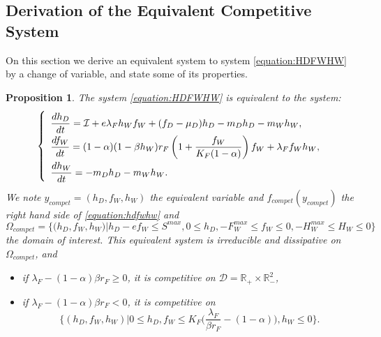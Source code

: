 \documentclass{article}
\newcommand{\lfw}{\lambda_{F}}
\newcommand{\lfw}{\lambda_{F}}
\newcommand{\cI}{\mathcal{I}}
\newcommand{\R}{\mathbb{R}}
\newtheorem{prop}[theorem]{Proposition}
\theoremstyle{definition}
\theoremstyle{remark}
\begin{document}
\subsection{Derivation of the Equivalent Competitive System}
On this section we derive an equivalent system to system \eqref{equation:HDFWHW} by a change of variable, and state some of its properties.
\begin{prop} \label{prop: equivalentSystem}
The system \eqref{equation:HDFWHW} is equivalent to the system:
\begin{equation}
\def\arraystretch{2}
\left\{ \begin{array}{l}
\dfrac{dh_D}{dt}= \cI + e\lfw h_W f_W + (f_D - \mu_D) h_D - m_D h_D - m_W h_W, \\
\dfrac{df_W}{dt} = (1-\alpha)(1 - \beta h_W) r_F \left(1 + \dfrac{f_W}{K_F(1-\alpha)} \right) f_W + \lfw f_W h_W, \\
\dfrac{dh_W}{dt}= -m_D h_D - m_W h_W. 
\end{array} \right.
\label{equation:hdfwhw}
\end{equation}
We note $y_{compet} = (h_D, f_W, h_W)$ the equivalent variable and $f_{compet}(y_{compet})$ the right hand side of \eqref{equation:hdfwhw} and 
$$
\Omega_{compet} = \Big\{\Big(h_D, f_W, h_W \Big)  \Big|h_D - ef_W \leq S^{max}, 0 \leq h_D,  -F_W^{max} \leq f_W \leq 0, -H_W^{max} \leq H_W \leq 0 \Big\}
$$ the domain of interest. 
This equivalent system is irreducible and dissipative on $\Omega_{compet}$, and
\begin{itemize}
\item if $\lfw - (1-\alpha)\beta r_F \geq 0$, it is competitive on $\mathcal{D} = \R_+ \times \R_-^2$,
\item if $\lfw - (1-\alpha)\beta r_F < 0$, it is competitive on $$\Big\{(h_D, f_W, h_W) | 0 \leq h_D, f_W \leq K_F\big(\dfrac{\lfw}{\beta r_F}-(1-\alpha)\big), h_W \leq 0 \Big\}.$$ 
\end{itemize}

\end{prop}
\end{document}
